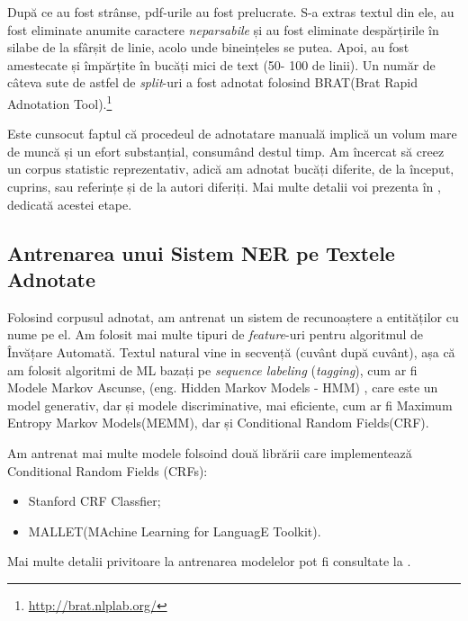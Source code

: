 După ce au fost strânse, pdf-urile au fost prelucrate. S-a extras textul din ele, au fost eliminate anumite caractere \textit{neparsabile} și au fost eliminate despărțirile în silabe de la sfârșit de linie, acolo unde bineințeles se putea. Apoi, au fost amestecate și împărțite în bucăți mici de text (50- 100 de linii). Un număr de câteva sute de astfel de \textit{split}-uri a fost adnotat folosind BRAT(Brat Rapid Adnotation Tool).\footnote{\url{http://brat.nlplab.org/}}

Este cunsocut faptul că procedeul de adnotatare manuală implică un volum mare de muncă și un efort substanțial, consumând destul timp. Am încercat să creez un corpus statistic reprezentativ, adică am adnotat bucăți diferite, de la început, cuprins, sau referințe și de la autori diferiți. Mai multe detalii voi prezenta în , dedicată acestei etape.

\subsection{Antrenarea unui Sistem NER pe Textele Adnotate}


Folosind corpusul adnotat, am antrenat un sistem de recunoaștere a entităților cu nume pe el. Am folosit mai multe tipuri de \textit{feature}-uri pentru algoritmul de Învățare Automată. Textul natural vine in secvență (cuvânt după cuvânt), așa că am folosit algoritmi de ML bazați pe \textit{sequence labeling} (\textit{tagging}), cum ar fi Modele Markov Ascunse, (eng. Hidden Markov Models - HMM) , care este un model generativ, dar și modele discriminative, mai eficiente, cum ar fi Maximum Entropy Markov Models(MEMM), dar și Conditional Random Fields(CRF).

Am antrenat mai multe modele folsoind două librării care implementează Conditional Random Fields (CRFs):
\begin{itemize}
\item Stanford CRF Classfier;
\item MALLET(MAchine Learning for LanguagE Toolkit).
\end{itemize}

Mai multe detalii privitoare la antrenarea modelelor pot fi consultate la .



